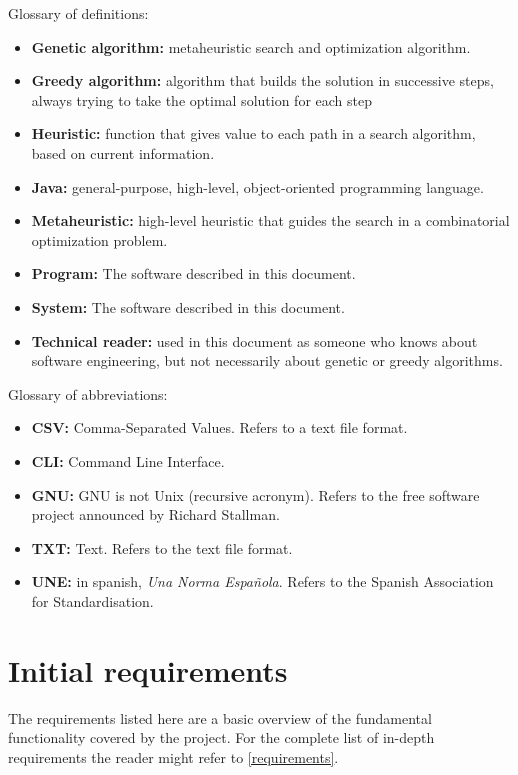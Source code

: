 Glossary of definitions:

\begin{itemize}
    \item \textbf{Genetic algorithm:} metaheuristic search and optimization algorithm. 
    \item \textbf{Greedy algorithm:} algorithm that builds the solution in successive steps, always trying to take the optimal solution for each step
    \item \textbf{Heuristic:} function that gives value to each path in a search algorithm, based on current information.
    \item \textbf{Java:} general-purpose, high-level, object-oriented programming language.
    \item \textbf{Metaheuristic:} high-level heuristic that guides the search in a combinatorial optimization problem.
    \item \textbf{Program:} The software described in this document.
    \item \textbf{System:} The software described in this document.
    \item \textbf{Technical reader:} used in this document as someone who knows about software engineering, but not necessarily about genetic or greedy algorithms.
\end{itemize}

Glossary of abbreviations:

\begin{itemize}
    \item \textbf{CSV:} Comma-Separated Values. Refers to a text file format.
    \item \textbf{CLI:} Command Line Interface.
    \item \textbf{GNU:} GNU is not Unix (recursive acronym). Refers to the free software project announced by Richard Stallman.
    \item \textbf{TXT:} Text. Refers to the text file format.
    \item \textbf{UNE:} in spanish, \textit{Una Norma Española}. Refers to the Spanish Association for Standardisation.
\end{itemize}

\section{Initial requirements}

The requirements listed here are a basic overview of the fundamental functionality covered by the project. For the complete list of in-depth requirements the reader might refer to \ref{requirements}.

